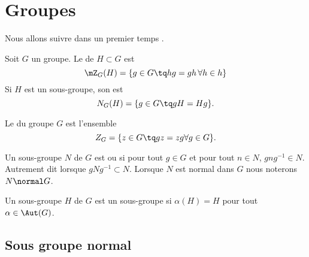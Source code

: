 \section{Groupes}

Nous allons suivre dans un premier temps \cite{Kropholler}.

\begin{definition}
    Soit \( G\) un groupe. Le  de \( H\subset G\) est 
    \begin{equation}
        \mZ_G(H)=\{ g\in G\tq hg=gh\,\forall h\in h\}
    \end{equation}
    Si \( H\) est un sous-groupe, son  est
    \begin{equation}
        N_G(H)=\{ g\in G\tq gH=Hg \}.
    \end{equation}
\end{definition}

Le  du groupe \( G\) est l'ensemble
\begin{equation}
    Z_G=\{ z\in G\tq gz=zg\forall g\in G \}.
\end{equation}

\begin{definition}
    Un sous-groupe \( N\) de \( G\) est  ou  si pour tout \( g\in G\) et pour tout \( n\in N\), \( gng^{-1}\in N\). Autrement dit lorsque \( gNg^{-1}\subset N\). Lorsque \( N\) est normal dans \( G\) nous noterons \( N\normal G\).

    Un sous-groupe \( H\) de \( G\) est un sous-groupe  si \( \alpha(H)=H\) pour tout \( \alpha\in \Aut(G)\).
\end{definition}

\subsection{Sous groupe normal}

